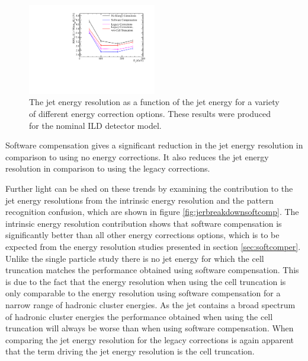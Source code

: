 \begin{figure}[h!]
\includegraphics[width=0.5\textwidth]{EnergyEstimators/Plots/SoftComp/JetEnergyResolution/JER_vs_JetEnergy_Default.pdf}
\caption[The jet energy resolution as a function of the jet energy for a variety of different energy correction options.  These results were produced for the nominal ILD detector model.]{The jet energy resolution as a function of the jet energy for a variety of different energy correction options.  These results were produced for the nominal ILD detector model.}
\label{fig:jersoftcomp}
\end{figure}

Software compensation gives a significant reduction in the jet energy resolution in comparison to using no energy corrections.  It also reduces the jet energy resolution in comparison to using the legacy corrections.  

Further light can be shed on these trends by examining the contribution to the jet energy resolutions from the intrinsic energy resolution and the pattern recognition confusion, which are shown in figure \ref{fig:jerbreakdownsoftcomp}.  The intrinsic energy resolution contribution shows that software compensation is significantly better than all other energy corrections options, which is to be expected from the energy resolution studies presented in section \ref{sec:softcomper}.  Unlike the single particle study there is no jet energy for which the cell truncation matches the performance obtained using software compensation.  This is due to the fact that the energy resolution when using the cell truncation is only comparable to the energy resolution using software compensation for a narrow range of hadronic cluster energies.  As the jet contains a broad spectrum of hadronic cluster energies the performance obtained when using the cell truncation will always be worse than when using software compensation.  When comparing the jet energy resolution for the legacy corrections is again apparent that the term driving the jet energy resolution is the cell truncation.

